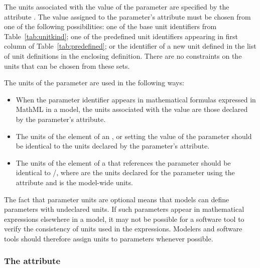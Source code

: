 The units associated with the value of the parameter are specified
by the attribute .  The value assigned to
the parameter's  attribute must be chosen
from one of the following possibilities: one of the base unit
identifiers from Table~\vref{tab:unitkind}; one of the predefined
unit identifiers appearing in first column of
Table~\vref{tab:predefined}; or the identifier of a new unit defined
in the list of unit definitions in the enclosing \Model definition.
There are no constraints on the units that can be chosen from
these sets.

The units of the parameter are used in the following ways:
\begin{itemize}

\item When the parameter identifier appears in mathematical
  formulas expressed in MathML in a model, the units associated
  with the value are those declared by the parameter's
   attribute.

\item The units of the  element of an \AssignmentRule,
  \InitialAssignment or \EventAssignment setting the value of the
  parameter should be identical to the units declared by the
  parameter's  attribute.

\item The units of the  element of a \RateRule that
  references the parameter should be identical to /, where  are
  the units declared for the parameter using the 
  attribute and  is the model-wide 
  units.

\end{itemize}
\vspace*{-1ex}

The fact that parameter units are optional means that models can 
define parameters with
undeclared units.  If such parameters appear in mathematical
expressions elsewhere in a model, it may not be possible for a
software tool to verify the consistency of units used in the
expressions.  Modelers and software tools should therefore assign
units to parameters whenever possible.


\subsubsection{The  attribute}
\label{sec:parameter-constant}

